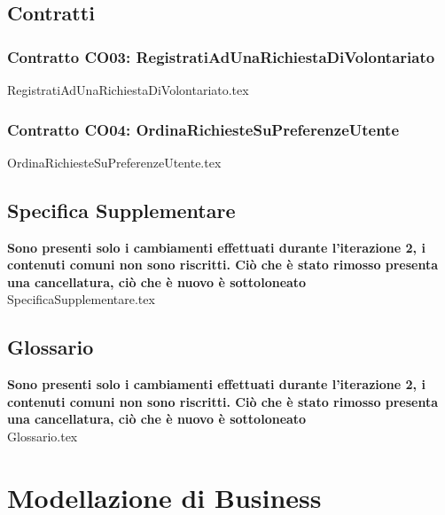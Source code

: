 \documentclass[12pt]{article}
\begin{document}
\subsection{Contratti}
\subsubsection{Contratto CO03: RegistratiAdUnaRichiestaDiVolontariato}
{RegistratiAdUnaRichiestaDiVolontariato.tex}

\subsubsection{Contratto CO04: OrdinaRichiesteSuPreferenzeUtente}
{OrdinaRichiesteSuPreferenzeUtente.tex}

\subsection{Specifica Supplementare}
\textbf{Sono presenti solo i cambiamenti effettuati durante l'iterazione 2, i contenuti comuni non sono riscritti. Ciò che è stato rimosso presenta una cancellatura, ciò che è nuovo è sottoloneato}\\
{SpecificaSupplementare.tex}

\subsection{Glossario}
\textbf{Sono presenti solo i cambiamenti effettuati durante l'iterazione 2, i contenuti comuni non sono riscritti. Ciò che è stato rimosso presenta una cancellatura, ciò che è nuovo è sottoloneato}\\
{Glossario.tex}

\section{Modellazione di Business}
\end{document}
